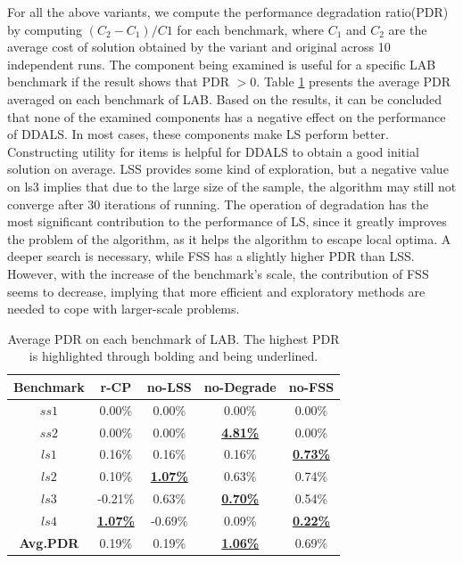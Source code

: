 \documentclass[lettersize,journal]{IEEEtran}
\begin{document}
For all the above variants, we compute the performance degradation ratio(PDR) by computing $(C_2-C_1)/C1$ for each benchmark, where $C_1$ and $C_2$ are the average cost of solution obtained by the variant and original across 10 independent runs. 
The component being examined is useful for a specific LAB benchmark if the result shows that PDR $>0$. 
Table \ref{variant of LS} presents the average PDR averaged on each benchmark of LAB. 
Based on the results, it can be concluded that none of the examined components has a negative effect on the performance of DDALS.
In most cases, these components make LS perform better. 
Constructing utility for items is helpful for DDALS to obtain a good initial solution on average. 
LSS provides some kind of exploration, but a negative value on ls3 implies that due to the large size of the sample, the algorithm may still not converge after 30 iterations of running. 
The operation of degradation has the most significant contribution to the performance of LS, since it greatly improves the problem of the algorithm, as it helps the algorithm to escape local optima. 
A deeper search is necessary, while FSS has a slightly higher PDR than LSS. 
However, with the increase of the benchmark's scale, the contribution of FSS seems to decrease, implying that more efficient and exploratory methods are needed to cope with larger-scale problems.

\begin{table}[!t]
\centering
\caption{Average PDR on each benchmark of LAB. The highest PDR is highlighted through bolding and being underlined. }
\begin{tabular}{ccccc}
\toprule
\bfseries Benchmark & r-CP & no-LSS & no-Degrade & no-FSS  \\
\midrule
{\bfseries $ss1$} &0.00\% &0.00\% &0.00\% &0.00\% \\
{\bfseries $ss2$} &0.00\% &0.00\% &\underline{\bfseries 4.81\%} &0.00\% \\
{\bfseries $ls1$} &0.16\% &0.16\% &0.16\% &\underline{\bfseries 0.73\%} \\
{\bfseries $ls2$} &0.10\% &\underline{\bfseries 1.07\%} &0.63\% &0.74\% \\
{\bfseries $ls3$} &-0.21\% &0.63\% &\underline{\bfseries 0.70\%} &0.54\% \\
{\bfseries $ls4$} &\underline{\bfseries 1.07\%} &-0.69\% &0.09\% &\underline{\bfseries 0.22\%} \\
\midrule
{\bfseries Avg.PDR} &0.19\% &0.19\% &\underline{\bfseries 1.06\%} &0.69\% \\
\bottomrule
\end{tabular}
\label{variant of LS}
\end{table}
\end{document}
